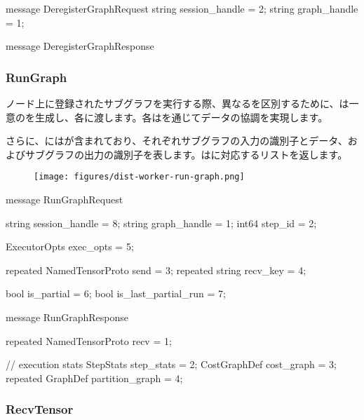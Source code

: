 \begin{content}
\begin{leftbar}
\begin{c++}
message DeregisterGraphRequest {
  string session_handle = 2;
  string graph_handle = 1;
}

message DeregisterGraphResponse {
}
\end{c++}
\end{leftbar}

\subsubsection{RunGraph}

ノード上に登録されたサブグラフを実行する際、異なるを区別するために、は一意のを生成し、各に渡します。各はを通じてデータの協調を実現します。

さらに、にはが含まれており、それぞれサブグラフの入力の識別子とデータ、およびサブグラフの出力の識別子を表します。はに対応するリストを返します。

\begin{figure}[H]
\centering
\texttt{[image: figures/dist-worker-run-graph.png]}
\caption{}
 \label{fig:dist-worker-run-graph}
\end{figure}

\begin{leftbar}
\begin{c++}
message RunGraphRequest {
  string session_handle = 8;
  string graph_handle = 1;
  int64 step_id = 2;

  ExecutorOpts exec_opts = 5;

  repeated NamedTensorProto send = 3;
  repeated string recv_key = 4;

  bool is_partial = 6;
  bool is_last_partial_run = 7;
}

message RunGraphResponse {
  repeated NamedTensorProto recv = 1;

  // execution stats
  StepStats step_stats = 2;
  CostGraphDef cost_graph = 3;
  repeated GraphDef partition_graph = 4;
}
\end{c++}
\end{leftbar}

\subsubsection{RecvTensor}


\end{content}
